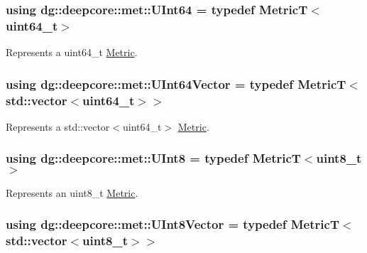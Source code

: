 \subsubsection[{\texorpdfstring{U\+Int64}{UInt64}}]{\setlength{\rightskip}{0pt plus 5cm}using {\bf dg\+::deepcore\+::met\+::\+U\+Int64} = typedef MetricT$<$uint64\+\_\+t$>$}\hypertarget{group___process_metrics_ga18c2b99cb1071590aa42afa19c39f7b9}{}\label{group___process_metrics_ga18c2b99cb1071590aa42afa19c39f7b9}


Represents a {\ttfamily uint64\+\_\+t} \hyperlink{classdg_1_1deepcore_1_1_metric}{Metric}. 

\subsubsection[{\texorpdfstring{U\+Int64\+Vector}{UInt64Vector}}]{\setlength{\rightskip}{0pt plus 5cm}using {\bf dg\+::deepcore\+::met\+::\+U\+Int64\+Vector} = typedef MetricT$<$std\+::vector$<$uint64\+\_\+t$>$$>$}\hypertarget{group___process_metrics_gab60bfff8e0160f83141f8685fc56c2a2}{}\label{group___process_metrics_gab60bfff8e0160f83141f8685fc56c2a2}


Represents a {\ttfamily std\+::vector$<$uint64\+\_\+t$>$} \hyperlink{classdg_1_1deepcore_1_1_metric}{Metric}. 

\subsubsection[{\texorpdfstring{U\+Int8}{UInt8}}]{\setlength{\rightskip}{0pt plus 5cm}using {\bf dg\+::deepcore\+::met\+::\+U\+Int8} = typedef MetricT$<$uint8\+\_\+t$>$}\hypertarget{group___process_metrics_ga17ad9985c2ab7f5e45d50cdcac20b857}{}\label{group___process_metrics_ga17ad9985c2ab7f5e45d50cdcac20b857}


Represents an {\ttfamily uint8\+\_\+t} \hyperlink{classdg_1_1deepcore_1_1_metric}{Metric}. 

\subsubsection[{\texorpdfstring{U\+Int8\+Vector}{UInt8Vector}}]{\setlength{\rightskip}{0pt plus 5cm}using {\bf dg\+::deepcore\+::met\+::\+U\+Int8\+Vector} = typedef MetricT$<$std\+::vector$<$uint8\+\_\+t$>$$>$}\hypertarget{group___process_metrics_gadf575847656bb4166faff7d30306d1f9}{}\label{group___process_metrics_gadf575847656bb4166faff7d30306d1f9}


